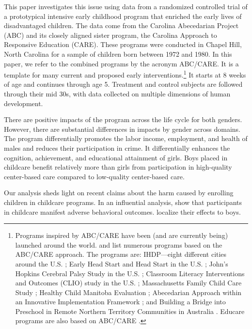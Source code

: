 This paper investigates this issue using data from a randomized controlled trial of a prototypical intensive early childhood program that enriched the early lives of disadvantaged children. The data come from the Carolina Abecedarian Project (ABC) and its closely aligned sister program, the Carolina Approach to Responsive Education (CARE). These programs were conducted in Chapel Hill, North Carolina for a sample of children born between 1972 and 1980. In this paper, we refer to the combined programs by the acronym ABC/CARE. It is a template for many current and proposed early interventions.\footnote{Programs inspired by ABC/CARE have been (and are currently being) launched around the world. \citet{Sparling_2010_Highlights} and \citet{Ramey_Ramey_Lanzi_2014_Interventions} list numerous programs based on the ABC/CARE approach. The programs are: IHDP---eight different cities around the U.S. \citep{Spiker-etal_1997_Helping}; Early Head Start and Head Start in the U.S. \citep{Schneider_McDonald-eds_2007_Scale-Up_Vol-1}; John's Hopkins Cerebral Palsy Study in the U.S. \citep{Sparling_2010_Highlights}; Classroom Literacy Interventions and Outcomes (CLIO) study in the U.S. \citep{Sparling_2010_Highlights}; Massachusetts Family Child Care Study \citep{Collins_etal_2010_Massachusetts-Study}; Healthy Child Manitoba Evaluation \citep{Healthy_Child_Manitoba_2015_Starting-Early}; Abecedarian Approach within an Innovative Implementation Framework \citep{Jensen_Nielsen_2016_ABC-Programme-Pilot}; and Building a Bridge into Preschool in Remote Northern Territory Communities in Australia \citep{UMonash_Dataset_2015_URL}. Educare programs are also based on ABC/CARE \citep{Educare_2014_Research_Agenda,Yazejian_Bryant_2012_Educare}.} It starts at 8 weeks of age and continues through age 5. Treatment and control subjects are followed through their mid 30s, with data collected on multiple dimensions of human development.

There are positive impacts of the program across the life cycle for both genders. However, there are substantial differences in impacts by gender across domains. The program differentially promotes the labor income, employment, and health of males and reduces their participation in crime. It differentially enhances the cognition, achievement, and educational attainment of girls. Boys placed in childcare benefit relatively more than girls from participation in high-quality center-based care compared to low-quality center-based care.

Our analysis sheds light on recent claims about the harm caused by enrolling children in childcare programs. In an influential analysis, \citet{Baker_Gruber_etal_2008_JPE} show that participants in childcare manifest adverse behavioral outcomes. \citet{Kottelenberg-Lehrer_2014_Gender-Effects} localize their effects to boys.

